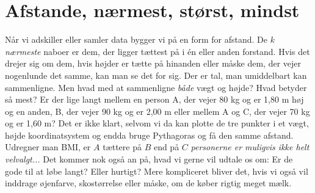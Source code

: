 \documentclass[a4paper, 12pt]{article}
\theoremstyle{remark}
\begin{document}
\section*{Afstande, nærmest, størst, mindst}
Når vi adskiller eller samler data bygger vi på en form for afstand. De $k$ \emph{ nærmeste} naboer er dem, der ligger tættest på i én eller anden forstand. 
Hvis det drejer sig om dem, hvis højder er tætte på hinanden eller måske dem, der vejer nogenlunde det samme, kan man se det for sig. 
Der er tal, man umiddelbart kan sammenligne. Men hvad med at sammenligne \emph{både} vægt og højde? Hvad betyder så mest? 
Er der lige langt mellem en person A, der vejer 80 kg og er 1,80 m høj og en anden, B,  der vejer 90 kg og er 2,00 m eller mellem A og C, der vejer 70 kg og er 1,60 m? 
Det er ikke klart, selvom vi da kan plotte de tre punkter i et vægt, højde koordinatsystem og endda bruge Pythagoras og få den samme afstand. 
Udregner man BMI, er $A$ tættere på $B$ end på $C$  \emph{personerne er muligvis ikke helt velvalgt...}
Det kommer nok også an på, hvad vi gerne vil udtale os om: Er de gode til at løbe langt? Eller hurtigt? Mere kompliceret bliver det, hvis vi også vil inddrage øjenfarve, skostørrelse eller måske, om de køber rigtig meget mælk.
\end{document}
